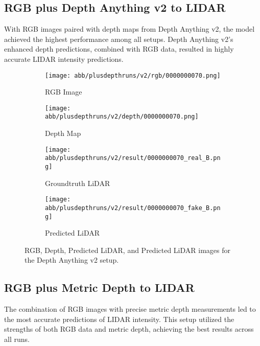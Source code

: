 \subsection{RGB plus Depth Anything v2 to LIDAR}
With RGB images paired with depth maps from Depth Anything v2, the model achieved the highest performance among all setups. Depth Anything v2’s enhanced depth predictions, combined with RGB data, resulted in highly accurate LIDAR intensity predictions.
\begin{figure}[!ht]
	\centering
	\begin{subfigure}{0.4\textwidth}
		\centering
		\texttt{[image: abb/plusdepthruns/v2/rgb/0000000070.png]}
		\caption{RGB Image}
		\label{fig:v2_rgb}
	\end{subfigure}
	
	\vspace{1em} %
	
	\begin{subfigure}{0.4\textwidth}
		\centering
		\texttt{[image: abb/plusdepthruns/v2/depth/0000000070.png]}
		\caption{Depth Map}
		\label{fig:v2_depth}
	\end{subfigure}
	
	\vspace{1em} %
	
	\begin{subfigure}{0.25\textwidth}
		\centering
		\texttt{[image: abb/plusdepthruns/v2/result/0000000070\_real\_B.png]}
		\caption{Groundtruth LiDAR}
		\label{fig:v2_pred_lidar}
	\end{subfigure}
	\begin{subfigure}{0.25\textwidth}
		\centering
		\texttt{[image: abb/plusdepthruns/v2/result/0000000070\_fake\_B.png]}
		\caption{Predicted LiDAR}
		\label{fig:v2_fake_lidar}
	\end{subfigure}
	
	\caption{RGB, Depth, Predicted LiDAR, and Predicted LiDAR images for the Depth Anything v2 setup.}
	\label{fig:v2plusdepth}
\end{figure}
\subsection{RGB plus Metric Depth to LIDAR}

The combination of RGB images with precise metric depth measurements led to the most accurate predictions of LIDAR intensity. This setup utilized the strengths of both RGB data and metric depth, achieving the best results across all runs.

